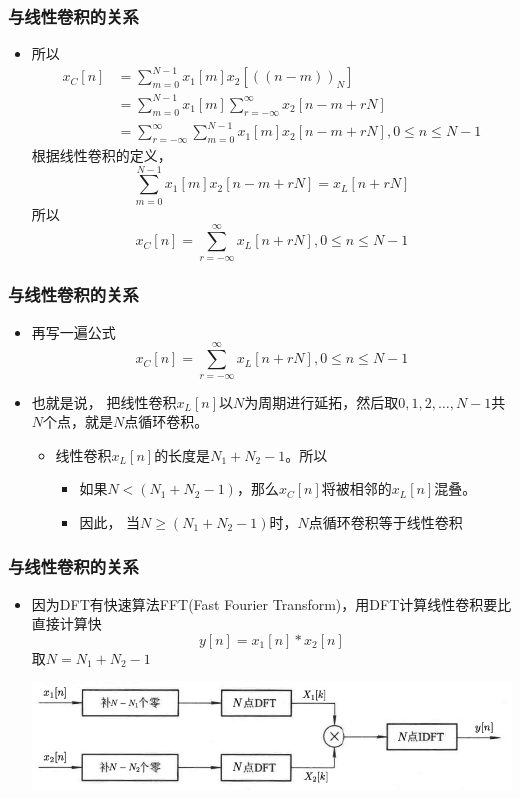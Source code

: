 \documentclass[CJKutf8,xcolor=pdftex,dvipsnames,table]{beamer}
\begin{document}
\begin{CJK*}{UTF8}{song}
  \begin{frame}
    \frametitle{与线性卷积的关系}
    \begin{itemize}
    \item 所以
    \begin{align*}
	    x_C[n] & = \sum_{m=0}^{N-1}x_1[m]x_2[((n-m))_N] 	\\    
	    & = \sum_{m=0}^{N-1}x_1[m]\sum_{r=-\infty}^{\infty} x_2[n-m+rN] \\
	    & = \sum_{r=-\infty}^{\infty} \sum_{m=0}^{N-1}x_1[m] x_2[n-m+rN], 0 \leq n \leq N-1 	    
    \end{align*}
    根据线性卷积的定义，
    \[
    \sum_{m=0}^{N-1}x_1[m] x_2[n-m+rN] = x_L[n+rN]
    \]
    所以
	\[
		x_C[n] = \sum_{r=-\infty}^{\infty} x_L[n+rN], 0 \leq n \leq N-1
	\]
	\end{itemize}
  \end{frame}   
  
  \begin{frame}
    \frametitle{与线性卷积的关系}
    \begin{itemize}
    \item 再写一遍公式
    \[
		x_C[n] = \sum_{r=-\infty}^{\infty} x_L[n+rN], 0 \leq n \leq N-1
	\]
    \item 也就是说，{\color{red} 把线性卷积$x_L[n]$以$N$为周期进行延拓，然后取$0, 1, 2, \hdots, N-1$共$N$个点，就是$N$点循环卷积。}
    	\begin{itemize}
    	\item 线性卷积$x_L[n]$的长度是$N_1+N_2-1$。所以
			\begin{itemize}
    		\item 如果$N < (N_1+N_2-1)$，那么$x_C[n]$将被相邻的$x_L[n]$混叠。
			\item 因此，{\color{red} 当$N \geq (N_1+N_2-1)$时，$N$点循环卷积等于线性卷积}
			\end{itemize}
    	\end{itemize}

	\end{itemize}
  \end{frame} 

  \begin{frame}
    \frametitle{与线性卷积的关系}
    \begin{itemize}
    \item 因为DFT有快速算法FFT(Fast Fourier Transform)，用DFT计算线性卷积要比直接计算快
	\[
		y[n] = x_1[n] \ast x_2[n]
	\]
	取$N=N_1+N_2-1$
    \begin{center}
      \includegraphics[scale=.37]{gxq-dsp-f3-4-1}
    \end{center}
	\end{itemize}
  \end{frame}   
  

\end{CJK*}
\end{document}
